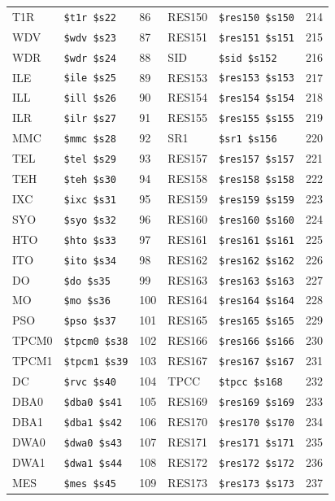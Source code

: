 \begin{table}
\begin{center}
{\begin{tabular}{|l|l|l||l|l|l|}
T1R & \verb|$t1r $s22| & 86 &
RES150 & \verb|$res150 $s150| & 214 \\
WDV & \verb|$wdv $s23| & 87 &
RES151 & \verb|$res151 $s151| & 215 \\
WDR & \verb|$wdr $s24| & 88 &
SID & \verb|$sid $s152| & 216 \\
ILE & \verb|$ile $s25| & 89 &
RES153 & \verb|$res153 $s153| & 217 \\
ILL & \verb|$ill $s26| & 90 &
RES154 & \verb|$res154 $s154| & 218 \\
ILR & \verb|$ilr $s27| & 91 &
RES155 & \verb|$res155 $s155| & 219 \\
MMC & \verb|$mmc $s28| & 92 &
SR1 & \verb|$sr1 $s156| & 220 \\
TEL & \verb|$tel $s29| & 93 &
RES157 & \verb|$res157 $s157| & 221 \\
TEH & \verb|$teh $s30| & 94 &
RES158 & \verb|$res158 $s158| & 222 \\
IXC & \verb|$ixc $s31| & 95 &
RES159 & \verb|$res159 $s159| & 223 \\
SYO & \verb|$syo $s32| & 96 &
RES160 & \verb|$res160 $s160| & 224 \\
HTO & \verb|$hto $s33| & 97 &
RES161 & \verb|$res161 $s161| & 225 \\
ITO & \verb|$ito $s34| & 98 &
RES162 & \verb|$res162 $s162| & 226 \\
DO & \verb|$do $s35| & 99 &
RES163 & \verb|$res163 $s163| & 227 \\
MO & \verb|$mo $s36| & 100 &
RES164 & \verb|$res164 $s164| & 228 \\
PSO & \verb|$pso $s37| & 101 &
RES165 & \verb|$res165 $s165| & 229 \\
TPCM0 & \verb|$tpcm0 $s38| & 102 &
RES166 & \verb|$res166 $s166| & 230 \\
TPCM1 & \verb|$tpcm1 $s39| & 103 &
RES167 & \verb|$res167 $s167| & 231 \\
DC & \verb|$rvc $s40| & 104 &
TPCC & \verb|$tpcc $s168| & 232 \\
DBA0 & \verb|$dba0 $s41| & 105 &
RES169 & \verb|$res169 $s169| & 233 \\
DBA1 & \verb|$dba1 $s42| & 106 &
RES170 & \verb|$res170 $s170| & 234 \\
DWA0 & \verb|$dwa0 $s43| & 107 &
RES171 & \verb|$res171 $s171| & 235 \\
DWA1 & \verb|$dwa1 $s44| & 108 &
RES172 & \verb|$res172 $s172| & 236 \\
MES & \verb|$mes $s45| & 109 &
RES173 & \verb|$res173 $s173| & 237 \\

\end{tabular}}
\end{center}
\end{table}
